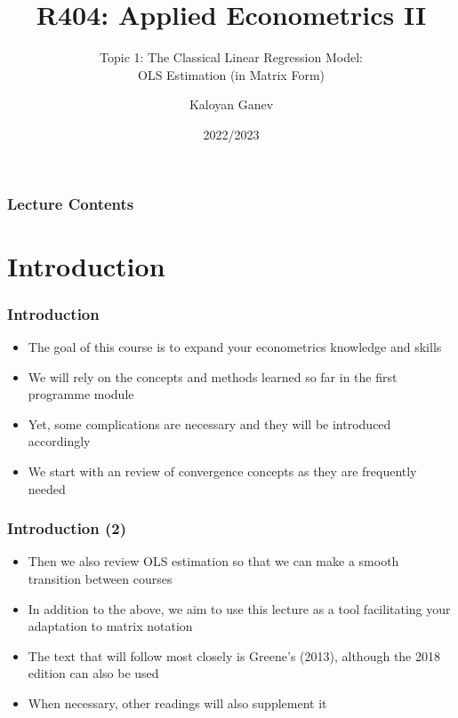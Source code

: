 \documentclass[10pt]{beamer}
\title{R404: Applied Econometrics II}
\subtitle{Topic 1: \textcolor{myred}{The Classical Linear Regression Model:\\ OLS Estimation (in Matrix Form)}}
\author{Kaloyan Ganev}
\date{2022/2023}
\theoremstyle{definition}
\begin{document}
\maketitle

\begin{frame}[fragile]
\frametitle{Lecture Contents}
\tableofcontents
\end{frame}

\section{Introduction}
\begin{frame}[fragile]
\frametitle{Introduction}
\begin{itemize}
	\item The goal of this course is to expand your econometrics knowledge and skills
	\item We will rely on the concepts and methods learned so far in the first programme module
	\item Yet, some complications are necessary and they will be introduced accordingly
	\item We start with an review of convergence concepts as they are frequently needed
\end{itemize}
\end{frame}

\begin{frame}[fragile]
	\frametitle{Introduction (2)}
	\begin{itemize}
		\item Then we also review OLS estimation so that we can make a smooth transition between courses
		\item In addition to the above, we aim to use this lecture as a tool facilitating your adaptation to matrix notation
		\item The text that will follow most closely is Greene's (2013), although the 2018 edition can also be used
		\item When necessary, other readings will also supplement it 
	\end{itemize}
\end{frame}
\end{document}
